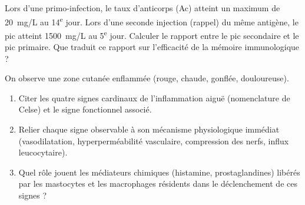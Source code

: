 \documentclass[11pt]{article}
\newcounter{popsec}
\newcounter{popsub}
\newcommand{\courssub}[1]{%
  \stepcounter{popsub}%
  \par\vspace{9pt}\noindent{\popxbold\fontsize{11.5}{13}\selectfont\color{popink}{\color{poporange}\thepopsec.\thepopsub}\hspace{6pt}#1}\par\nopagebreak\vspace{4pt}
}
\begin{document}
\begin{exercice}
Lors d'une primo-infection, le taux d'anticorps (Ac) atteint un maximum de \SI{20}{mg/L} au 14\textsuperscript{e} jour. Lors d'une seconde injection (rappel) du même antigène, le pic atteint \SI{1500}{mg/L} au 5\textsuperscript{e} jour.
Calculer le rapport entre le pic secondaire et le pic primaire. Que traduit ce rapport sur l'efficacité de la mémoire immunologique ?
\end{exercice}

\begin{exercice}
On observe une zone cutanée enflammée (rouge, chaude, gonflée, douloureuse).
\begin{enumerate}
    \item Citer les quatre signes cardinaux de l'inflammation aiguë (nomenclature de Celse) et le signe fonctionnel associé.
    \item Relier chaque signe observable à son mécanisme physiologique immédiat (vasodilatation, hyperperméabilité vasculaire, compression des nerfs, influx leucocytaire).
    \item Quel rôle jouent les médiateurs chimiques (histamine, prostaglandines) libérés par les mastocytes et les macrophages résidents dans le déclenchement de ces signes ?
\end{enumerate}
\end{exercice}

\courssub{Je m'entraîne}
\end{document}
